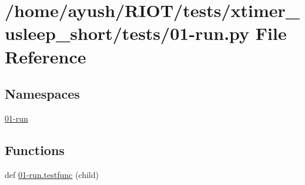 \hypertarget{xtimer__usleep__short_2tests_201-run_8py}{}\section{/home/ayush/\+R\+I\+O\+T/tests/xtimer\+\_\+usleep\+\_\+short/tests/01-\/run.py File Reference}
\label{xtimer__usleep__short_2tests_201-run_8py}
\subsection*{Namespaces}
\begin{DoxyCompactItemize}
\item 
 \hyperlink{namespace01-run}{01-\/run}
\end{DoxyCompactItemize}
\subsection*{Functions}
\begin{DoxyCompactItemize}
\item 
def \hyperlink{namespace01-run_aff983ffd4ab0e6bf8e7e58970e4a10bb}{01-\/run.\+testfunc} (child)
\end{DoxyCompactItemize}
